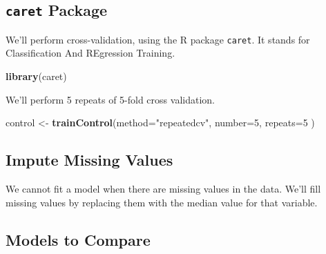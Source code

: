 \documentclass[]{book}
\newenvironment{Shaded}{\begin{snugshade}}{\end{snugshade}}
\newcommand{\KeywordTok}[1]{\textcolor[rgb]{0.13,0.29,0.53}{\textbf{#1}}}
\newcommand{\DataTypeTok}[1]{\textcolor[rgb]{0.13,0.29,0.53}{#1}}
\newcommand{\DecValTok}[1]{\textcolor[rgb]{0.00,0.00,0.81}{#1}}
\newcommand{\StringTok}[1]{\textcolor[rgb]{0.31,0.60,0.02}{#1}}
\newcommand{\OperatorTok}[1]{\textcolor[rgb]{0.81,0.36,0.00}{\textbf{#1}}}
\newcommand{\NormalTok}[1]{#1}
\begin{document}
\subsection{\texorpdfstring{\texttt{caret}
Package}{caret Package}}\label{caret-package}

We'll perform cross-validation, using the R package \texttt{caret}. It
stands for Classification And REgression Training.

\begin{Shaded}
\begin{Highlighting}[]
\KeywordTok{library}\NormalTok{(caret)}
\end{Highlighting}
\end{Shaded}

We'll perform 5 repeats of 5-fold cross validation.

\begin{Shaded}
\begin{Highlighting}[]
\NormalTok{control <-}\StringTok{ }\KeywordTok{trainControl}\NormalTok{(}\DataTypeTok{method=}\StringTok{"repeatedcv"}\NormalTok{, }\DataTypeTok{number=}\DecValTok{5}\NormalTok{, }\DataTypeTok{repeats=}\DecValTok{5}\NormalTok{ )}
\end{Highlighting}
\end{Shaded}

\subsection{Impute Missing Values}\label{impute-missing-values}

We cannot fit a model when there are missing values in the data. We'll
fill missing values by replacing them with the median value for that
variable.

\begin{Shaded}
\end{Shaded}

\subsection{Models to Compare}\label{models-to-compare}
\end{document}
